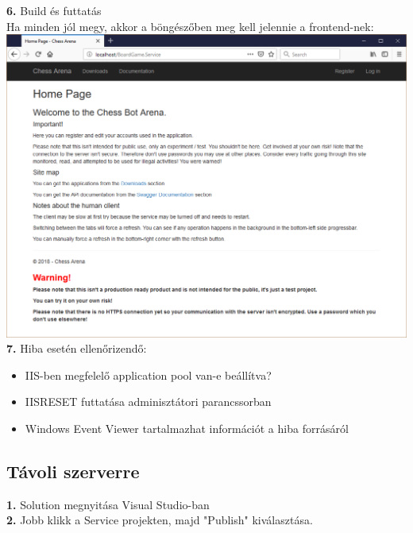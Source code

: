 \documentclass[twoside, a4paper, 12pt]{book}
\begin{document}
\noindent \textbf{6.} Build és futtatás \\
Ha minden jól megy, akkor a böngészőben meg kell jelennie a frontend-nek: \\
\includegraphics[width=1.0\textwidth]{img/server_dev_run_5.png} \\

\noindent \textbf{7.} Hiba esetén ellenőrizendő:
\begin{itemize}
	\item IIS-ben megfelelő application pool van-e beállítva?
	\item IISRESET futtatása adminisztátori parancssorban
	\item Windows Event Viewer tartalmazhat információt a hiba forrásáról
\end{itemize}





\subsection{Távoli szerverre}
\noindent \textbf{1.} Solution megnyitása Visual Studio-ban \\

\noindent \textbf{2.} Jobb klikk a Service projekten, majd "Publish" kiválasztása. \\
\end{document}
